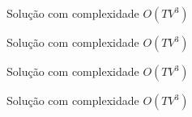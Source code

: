 \begin{frame}[fragile]{Solução com complexidade $O(TV^3)$}
\end{frame}

\begin{frame}[fragile]{Solução com complexidade $O(TV^3)$}
\end{frame}

\begin{frame}[fragile]{Solução com complexidade $O(TV^3)$}
\end{frame}

\begin{frame}[fragile]{Solução com complexidade $O(TV^3)$}
\end{frame}
